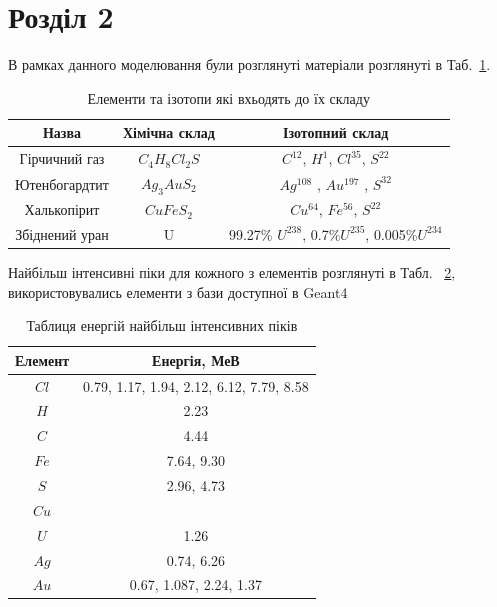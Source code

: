 \documentclass[a4paper, 14pt]{article}
\numberwithin{equation}{section}
\numberwithin{table}{section}
\begin{document}
\section{Розділ 2}
\setcounter{figure}{0}
В рамках данного моделювання були розглянуті матеріали розглянуті в Таб.~\ref{tabl:Materials}.
\begin{table}[h]
	\centering
	\begin{tabular}{|c|c|c|}
		\hline
		Назва & Хімічна склад & Ізотопний склад \\
		\hline
		Гірчичний газ & $C_4H_8Cl_2S$ & $C^{12}$, 	$H^1$, $Cl^{35}$, $S^{22}$ \\
		\hline
		Ютенбогардтит & $Ag_3AuS_2$ & $Ag^{108}$ , $Au^{197}$ , $S^{32}$ \\
		\hline
		Халькопірит & $CuFeS_2$ & $Cu^{64}$, $Fe^{56}$, $S^{22}$ \\
		\hline
		Збіднений уран & U & 99.27\% $U^{238}$, 0.7\%$U^{235}$, 0.005\%$U^{234}$\\
		\hline
	\end{tabular}
\caption{Елементи та ізотопи які вхьодять до їх складу} 
\label{tabl:Materials}
\end{table}

Найбільш інтенсивні піки для кожного з елементів розглянуті в Табл. ~\ref{tabl:ElementsEnergy}, використовувались елементи з бази доступної в Geant4
\begin{table}[h]
\centering
	\begin{tabular}{|c|c|} 
		\hline
		Елемент& Енергія, МеВ \\
		\hline
		$Cl$ & 0.79, 1.17, 1.94, 2.12, 6.12, 7.79, 8.58 \\
		\hline
		$H$ & 2.23 \\
		\hline
		$C$ & 4.44 \\
		\hline
		$Fe$ & 7.64, 9.30 \\		
		\hline
		$S$ & 2.96, 4.73 \\
		\hline
		$Cu$ &  \\
		\hline
		$U$ & 1.26\\
		\hline
		$Ag$ &  0.74, 6.26 \\
		\hline
		$Au$ & 0.67, 1.087, 2.24, 1.37  \\
		
		\hline
	\end{tabular}
\caption{Таблиця енергій найбільш інтенсивних піків} 
\label{tabl:ElementsEnergy}
\end{table}
\end{document}
